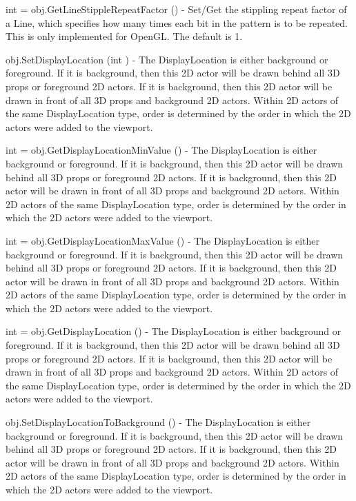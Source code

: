 \begin{DoxyItemize}
\item {\ttfamily int = obj.\-Get\-Line\-Stipple\-Repeat\-Factor ()} -\/ Set/\-Get the stippling repeat factor of a Line, which specifies how many times each bit in the pattern is to be repeated. This is only implemented for Open\-G\-L. The default is 1.  
\item {\ttfamily obj.\-Set\-Display\-Location (int )} -\/ The Display\-Location is either background or foreground. If it is background, then this 2\-D actor will be drawn behind all 3\-D props or foreground 2\-D actors. If it is background, then this 2\-D actor will be drawn in front of all 3\-D props and background 2\-D actors. Within 2\-D actors of the same Display\-Location type, order is determined by the order in which the 2\-D actors were added to the viewport.  
\item {\ttfamily int = obj.\-Get\-Display\-Location\-Min\-Value ()} -\/ The Display\-Location is either background or foreground. If it is background, then this 2\-D actor will be drawn behind all 3\-D props or foreground 2\-D actors. If it is background, then this 2\-D actor will be drawn in front of all 3\-D props and background 2\-D actors. Within 2\-D actors of the same Display\-Location type, order is determined by the order in which the 2\-D actors were added to the viewport.  
\item {\ttfamily int = obj.\-Get\-Display\-Location\-Max\-Value ()} -\/ The Display\-Location is either background or foreground. If it is background, then this 2\-D actor will be drawn behind all 3\-D props or foreground 2\-D actors. If it is background, then this 2\-D actor will be drawn in front of all 3\-D props and background 2\-D actors. Within 2\-D actors of the same Display\-Location type, order is determined by the order in which the 2\-D actors were added to the viewport.  
\item {\ttfamily int = obj.\-Get\-Display\-Location ()} -\/ The Display\-Location is either background or foreground. If it is background, then this 2\-D actor will be drawn behind all 3\-D props or foreground 2\-D actors. If it is background, then this 2\-D actor will be drawn in front of all 3\-D props and background 2\-D actors. Within 2\-D actors of the same Display\-Location type, order is determined by the order in which the 2\-D actors were added to the viewport.  
\item {\ttfamily obj.\-Set\-Display\-Location\-To\-Background ()} -\/ The Display\-Location is either background or foreground. If it is background, then this 2\-D actor will be drawn behind all 3\-D props or foreground 2\-D actors. If it is background, then this 2\-D actor will be drawn in front of all 3\-D props and background 2\-D actors. Within 2\-D actors of the same Display\-Location type, order is determined by the order in which the 2\-D actors were added to the viewport.  

\end{DoxyItemize}

